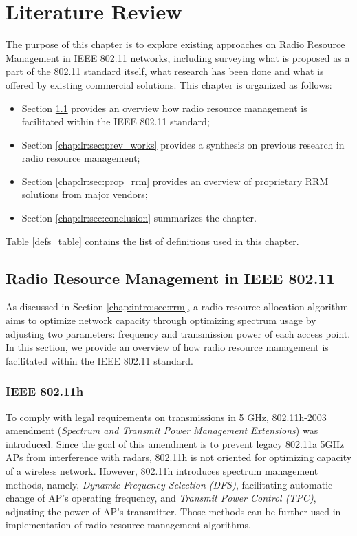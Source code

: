 \chapter{Literature Review}
\label{chap:lr}
\chaptermark{}
The purpose of this chapter is to explore existing approaches on Radio Resource Management in IEEE 802.11 networks, including surveying what is proposed as a part of the 802.11 standard itself, what research has been done and what is offered by existing commercial solutions. This chapter is organized as follows:
\begin{itemize}
    \item Section \ref{chap:lr:sec:rrm_80211} provides an overview how radio resource management is facilitated within the IEEE 802.11 standard;
    \item Section \ref{chap:lr:sec:prev_works} provides a synthesis on previous research in radio resource management;
    \item Section \ref{chap:lr:sec:prop_rrm} provides an overview of proprietary RRM solutions from major vendors;
    \item Section \ref{chap:lr:sec:conclusion} summarizes the chapter.
\end{itemize}
Table \ref{defs_table} contains the list of definitions used in this chapter.

\section {Radio Resource Management in IEEE 802.11}
\label{chap:lr:sec:rrm_80211}
As discussed in Section \ref{chap:intro:sec:rrm}, a radio resource allocation algorithm aims to optimize network capacity through optimizing spectrum usage by adjusting two parameters: frequency and transmission power of each access point. In this section, we provide an overview of how radio resource management is facilitated within the IEEE 802.11 standard.

\subsection {IEEE 802.11h}
\label{chap:lr:sec:80211h}
To comply with legal requirements on transmissions in 5 GHz, 802.11h-2003 \cite{80211h} amendment (\textit{Spectrum and Transmit Power Management Extensions}) was introduced. Since the goal of this amendment is to prevent legacy 802.11a 5GHz APs from interference with radars, 802.11h is not oriented for optimizing capacity of a wireless network. However, 802.11h introduces \cite{konsgenSpectrumManagementAlgorithms2010} spectrum management methods, namely, \textit{Dynamic Frequency Selection (DFS)}, facilitating automatic change of AP's operating frequency, and \textit{Transmit Power Control (TPC)}, adjusting the power of AP's transmitter. Those methods can be further used in implementation of radio resource management algorithms.

